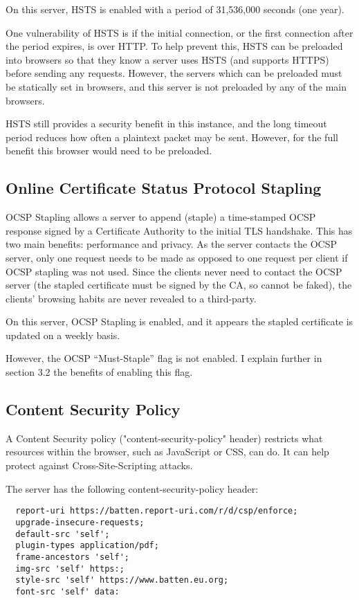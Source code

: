 \documentclass[12pt]{article}
\begin{document}
  On this server, HSTS is enabled with a period of 31,536,000 seconds (one year).

  One vulnerability of HSTS is if the initial connection, or the first connection after the period expires, is over HTTP.
  To help prevent this, HSTS can be preloaded into browsers so that they know a server uses HSTS (and supports HTTPS) before sending any requests.
  However, the servers which can be preloaded must be statically set in browsers, and this server is not preloaded by any of the main browsers.
  
  HSTS still provides a security benefit in this instance, and the long timeout period reduces how often a plaintext packet may be sent.
  However, for the full benefit this browser would need to be preloaded.

  \subsection{Online Certificate Status Protocol Stapling}
  OCSP Stapling allows a server to append (staple) a time-stamped OCSP response signed by a Certificate Authority to the initial TLS handshake.
  This has two main benefits: performance and privacy.
  As the server contacts the OCSP server, only one request needs to be made as opposed to one request per client if OCSP stapling was not used.
  Since the clients never need to contact the OCSP server (the stapled certificate must be signed by the CA, so cannot be faked), the clients' browsing habits are never revealed to a third-party.
  
  On this server, OCSP Stapling is enabled, and it appears the stapled certificate is updated on a weekly basis.

  However, the OCSP ``Must-Staple'' flag is not enabled.
  I explain further in section 3.2 the benefits of enabling this flag.

  \subsection{Content Security Policy}
  A Content Security policy ("content-security-policy" header) restricts what resources within the browser, such as JavaScript or CSS, can do.
  It can help protect against Cross-Site-Scripting attacks.

  The server has the following content-security-policy header:
  \begin{verbatim}
  report-uri https://batten.report-uri.com/r/d/csp/enforce; 
  upgrade-insecure-requests; 
  default-src 'self'; 
  plugin-types application/pdf; 
  frame-ancestors 'self'; 
  img-src 'self' https:; 
  style-src 'self' https://www.batten.eu.org; 
  font-src 'self' data:
  \end{verbatim}
\end{document}
